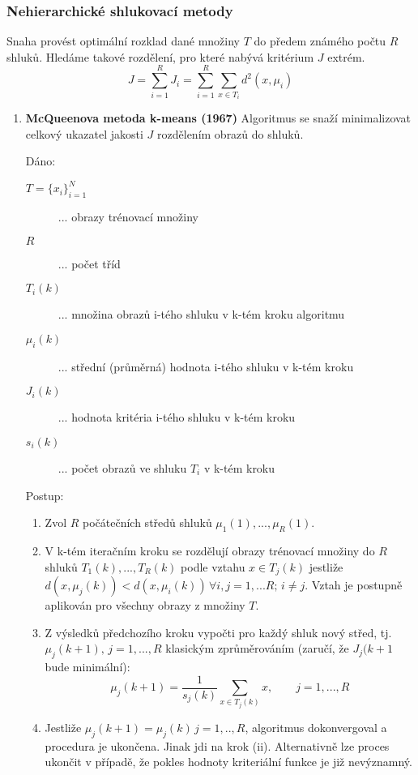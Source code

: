\subsubsection*{Nehierarchické shlukovací metody}
Snaha provést optimální rozklad dané množiny $ T $ do předem známého počtu $ R $ shluků. Hledáme takové rozdělení, pro které nabývá kritérium $ J $ extrém.
\begin{equation}
J = \displaystyle{\sum_{i=1}^R J_i} = \displaystyle{\sum_{i=1}^R \sum_{x \in T_i} d^2(x, \mu_i)}
\end{equation}
\begin{enumerate}
\item \textbf{McQueenova metoda k-means (1967)}
Algoritmus se snaží minimalizovat celkový ukazatel jakosti $ J $ rozdělením obrazů do shluků.

Dáno:
\begin{description}
\item[$ T = \{x_i\}_{i=1}^N $] ... obrazy trénovací množiny
\item[$ R $] ... počet tříd
\item[$ T_i(k) $] ... množina obrazů i-tého shluku v k-tém kroku algoritmu
\item[$ \mu_i(k) $] ... střední (průměrná) hodnota i-tého shluku v k-tém kroku
\item[$ J_i(k) $] ... hodnota kritéria i-tého shluku v k-tém kroku
\item[$ s_i(k) $] ... počet obrazů ve shluku $ T_i $ v k-tém kroku
\end{description}
Postup:
\begin{enumerate}[label=(\roman*)]
\item Zvol $ R $ počátečních středů shluků $ \mu_1(1), ..., \mu_R(1) $.
\item V k-tém iteračním kroku se rozdělují obrazy trénovací množiny do $ R $ shluků $ T_1(k), ..., T_R(k) $ podle vztahu $ x \in T_j(k) $ jestliže $ d(x, \mu_j(k)) < d(x, \mu_i(k)) \, \forall i,j=1,...R; \, i \neq j $. Vztah je postupně aplikován pro všechny obrazy z množiny $ T $.
\item Z výsledků předchozího kroku vypočti pro každý shluk nový střed, tj. $ \mu_j(k+1), \, j=1,...,R $ klasickým zprůměrováním (zaručí, že $ J_j(k+1 $ bude minimální):
\begin{equation}
\mu_j(k+1) =  \frac{1}{s_j(k)} \displaystyle{\sum_{x \in T_j(k)} x}, \qquad j=1,...,R
\end{equation}
\item Jestliže $ \mu_j(k+1) = \mu_j(k) \, j=1,..,R $, algoritmus dokonvergoval a procedura je ukončena. Jinak jdi na krok (ii). Alternativně lze proces ukončit v případě, že pokles hodnoty kriteriální funkce je již nevýznamný.
\end{enumerate}


\end{enumerate}
